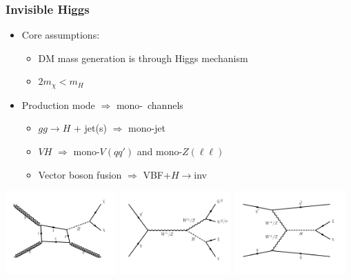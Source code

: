 \documentclass[aspectratio=169,xcolor=dvipsnames,,table,compress]{beamer}
\begin{document}

\begin{frame} \frametitle{Invisible Higgs}
    \vspace{-3mm}
      \begin{itemize}
        \item Core assumptions: 
        \begin{itemize}
          \item DM mass generation is through Higgs mechanism 
          \item $2m_\chi < m_H$ 
        \end{itemize}
        \item Production mode $\Rightarrow$  mono-\X~channels
        \begin{itemize}
          \item $gg\rightarrow H$ + jet(s) $\Rightarrow$ mono-jet
          \item $VH$ $\Rightarrow$ mono-$V(qq')$ and mono-$Z(\ell\ell)$
          \item Vector boson fusion $\Rightarrow$ VBF+$H\rightarrow$inv
        \end{itemize}
      \end{itemize}
      \centering
      \includegraphics[width=0.32\textwidth]{../figures/vbf/diagrams/ggf_hinv.pdf}
      \includegraphics[width=0.32\textwidth]{../figures/vbf/diagrams/zh_hinv.pdf}
      \includegraphics[width=0.32\textwidth]{../figures/vbf/diagrams/vbf_hinv.pdf}
\end{frame}
\end{document}
